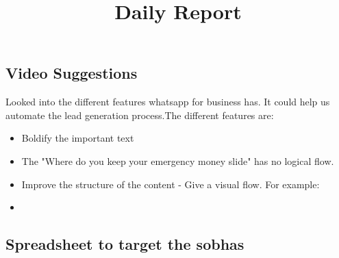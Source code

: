 \documentclass[12pt, a4paper]{article}
\begin{document}
\title{Daily Report}
\maketitle

\subsection{Video Suggestions}

Looked into the different features whatsapp for business has. It could help us automate the lead generation process.The different features are:

\begin{itemize}
    \item Boldify the important text
    \item The "Where do you keep your emergency money slide" has no logical flow.
    \item Improve the structure of the content - Give a visual flow. For example:
    \item
\end{itemize}


\vspace{0.5cm}

\subsection{Spreadsheet to target the sobhas}


\vspace{0.25cm}
\end{document}

